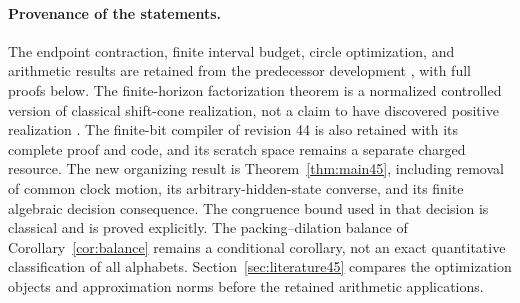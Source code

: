 \paragraph{Provenance of the statements.}
The endpoint contraction, finite interval budget, circle optimization, and arithmetic results are retained from the predecessor development \cite{GTF35,GTF42,GTF43}, with full proofs below. The finite-horizon factorization theorem is a normalized controlled version of classical shift-cone realization, not a claim to have discovered positive realization \cite{BF,Ben22,Ohta}. The finite-bit compiler of revision 44 is also retained with its complete proof and code, and its scratch space remains a separate charged resource. The new organizing result is Theorem~\ref{thm:main45}, including removal of common clock motion, its arbitrary-hidden-state converse, and its finite algebraic decision consequence. The congruence bound used in that decision is classical and is proved explicitly. The packing--dilation balance of Corollary~\ref{cor:balance} remains a conditional corollary, not an exact quantitative classification of all alphabets. Section~\ref{sec:literature45} compares the optimization objects and approximation norms before the retained arithmetic applications.
